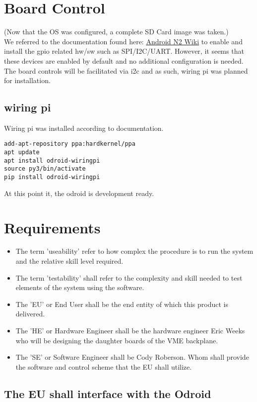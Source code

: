 \documentclass[11pt,letterpaper]{article}
\begin{document}
\section{Board Control}
 (Now that the OS was configured, a complete SD Card image was taken.)\\
We referred to the documentation found here:
\href{https://wiki.odroid.com/odroid-n2/application_note/gpio}{Android N2 Wiki}
to enable and install the gpio related hw/sw such as SPI/I2C/UART.
However, it seems that these devices are enabled by default and no additional configuration is needed.
The board controls will be facilitated via i2c and as such, wiring pi was planned for installation.

\subsection{wiring pi}
Wiring pi was installed according to documentation.
\begin{verbatim}
add-apt-repository ppa:hardkernel/ppa
apt update
apt install odroid-wiringpi
source py3/bin/activate
pip install odroid-wiringpi
\end{verbatim}
At this point it, the odroid is development ready.
%
%
\newpage
\section{Requirements}


\begin{itemize}
	\item The term 'useability' refer to how complex the procedure is to run the system and the relative skill level required.
	\item The term 'testability' shall refer to the complexity and skill needed to test elements of the system using the software.
	\item The 'EU' or End User shall be the end entity of which this product is delivered.
	\item The 'HE' or Hardware Engineer shall be the hardware engineer Eric Weeks who will be designing the daughter boards of the VME backplane.
	\item The 'SE' or Software Engineer shall be Cody Roberson. Whom shall provide the software and control scheme that the EU shall utilize.
\end{itemize}


\subsection{The EU shall interface with the Odroid}
\end{document}
